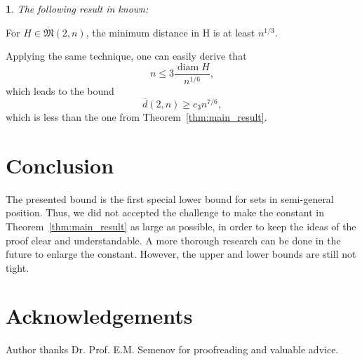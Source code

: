 \documentclass[11pt,twoside,draft
]{article}
\newtheorem{Remark}{\indent {\sc Remark}}
\renewcommand*{\&}{\textbackslash \symbol{38}}%
\begin{document}
\begin{Remark}
	The following result in known:
\end{Remark}

\begin{lemma}
	\cite[Corollary 1]{solymosi2003note}
	For $H \in \overline {\mathfrak{M}}(2,n)$, the minimum
	distance in H is at least $n^{1/3}$.
\end{lemma}
Applying the same technique, one can easily derive that
\begin{equation}
	n \leq 3 \frac{\operatorname{diam} H }{n^{1/6}}
	,
\end{equation}
which leads to the bound
\begin{equation}
	\overline{d}(2,n) \geq c_3 n^{7/6}
	,
\end{equation}
which is less than the one from Theorem~\ref{thm:main_result}.


\section{Conclusion}
The presented bound is the first special lower bound for sets in semi-general position.
Thus, we did not accepted the challenge to make the constant in Theorem~\ref{thm:main_result} as large as possible,
in order to keep the ideas of the proof clear and understandable.
A more thorough research can be done in the future to enlarge the constant.
However, the upper and lower bounds are still not tight.

\section{Acknowledgements}
Author thanks Dr. Prof. E.M. Semenov for proofreading and valuable advice.








%
%
%






%
%

\label{end}
\end{document}
